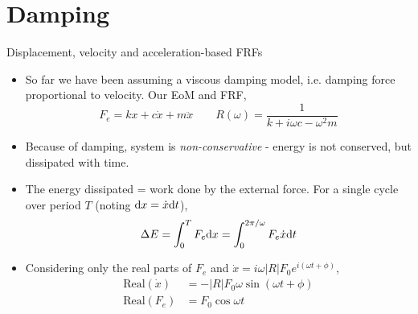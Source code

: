 \documentclass[11pt,aspectratio=169,handout]{beamer}
\begin{document}
\section{Damping}
\begin{frame}[c]{Displacement, velocity and acceleration-based FRFs}
	\begin{itemize}
		\item<1-> So far we have been assuming a viscous damping model, i.e. damping force proportional to velocity. Our EoM and FRF,
		\begin{equation}\label{}
			F_e =  kx + c\dot{x} +  m\ddot{x} \quad \quad  R(\omega) =  \frac{1}{k + i\omega c - \omega^2 m} 
		\end{equation}
	\item<1-> Because of damping, system is \textit{non-conservative} - energy is not conserved, but dissipated with time. 
	\item<2-> The energy dissipated = work done by the external force. For a single cycle over period $T$ (noting ${\rm d}x = \dot{x}{\rm d}t$),
	\begin{equation}
		\Delta E = \int_0^{T} F_e {\rm d}x = \int_0^{2\pi/\omega} F_e\dot{x} {\rm d}t
	\end{equation}
	\item<3-> Considering only the real parts of $F_e$ and $\dot{x} = i\omega|R|F_0 e^{i(\omega t+\phi)}$,
	\begin{align}
		\mbox{Real}(\dot{x}) &= -|R| F_0 \omega \sin(\omega t + \phi)\\
		\mbox{Real}(F_e) &= F_0 \cos\omega t
	\end{align}
	\end{itemize}
\end{frame}
\end{document}
